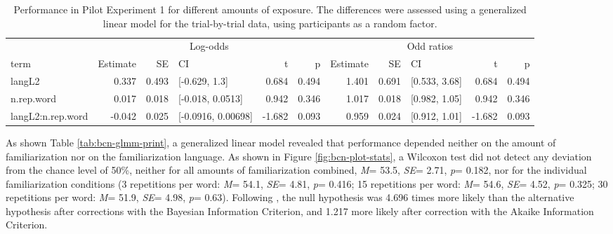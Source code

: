 \documentclass[
]{article}
\newcommand{\p}{{\em p\/}}
\newcommand{\M}{{\em M\/}}
\newcommand{\SE}{{\em SE\/}}
\begin{document}
\begin{table}[!h]

\caption{\label{tab:bcn-glmm-print}Performance in Pilot Experiment 1 for different amounts of exposure. The differences were assessed using a generalized linear model for the trial-by-trial data, using participants as a random factor.}
\centering
{}
\end{table}

\begin{table}

\caption{\label{tab:bcn-glmm-print-with-or}Performance in Pilot Experiment 1 for different amounts of exposure. The differences were assessed using a generalized linear model for the trial-by-trial data, using participants as a random factor.}
\centering
\begin{tabular}[t]{lrrlrrrrlrr}
\toprule
\multicolumn{1}{c}{ } & \multicolumn{5}{c}{Log-odds} & \multicolumn{5}{c}{Odd ratios} \\
\cmidrule(l{3pt}r{3pt}){2-6} \cmidrule(l{3pt}r{3pt}){7-11}
term & Estimate & SE & CI & t & p & Estimate & SE & CI & t & p\\
\midrule
langL2 & 0.337 & 0.493 & {}[-0.629, 1.3] & 0.684 & 0.494 & 1.401 & 0.691 & {}[0.533, 3.68] & 0.684 & 0.494\\
n.rep.word & 0.017 & 0.018 & {}[-0.018, 0.0513] & 0.942 & 0.346 & 1.017 & 0.018 & {}[0.982, 1.05] & 0.942 & 0.346\\
langL2:n.rep.word & -0.042 & 0.025 & {}[-0.0916, 0.00698] & -1.682 & 0.093 & 0.959 & 0.024 & {}[0.912, 1.01] & -1.682 & 0.093\\
\bottomrule
\end{tabular}
\end{table}

As shown Table \ref{tab:bcn-glmm-print}, a generalized linear model
revealed that performance depended neither on the amount of
familiarization nor on the familiarization language. As shown in Figure
\ref{fig:bcn-plot-stats}, a Wilcoxon test did not detect any deviation
from the chance level of 50\%, neither for all amounts of
familiarization combined, \M = 53.5, \SE = 2.71, \p = 0.182, nor for the
individual familiarization conditions (3 repetitions per word: \M =
54.1, \SE = 4.81, \p = 0.416; 15 repetitions per word: \M = 54.6, \SE =
4.52, \p = 0.325; 30 repetitions per word: \M = 51.9, \SE = 4.98, \p =
0.63). Following \citet{Glover2004}, the null hypothesis was 4.696 times
more likely than the alternative hypothesis after corrections with the
Bayesian Information Criterion, and 1.217 more likely after correction
with the Akaike Information Criterion.
\end{document}
